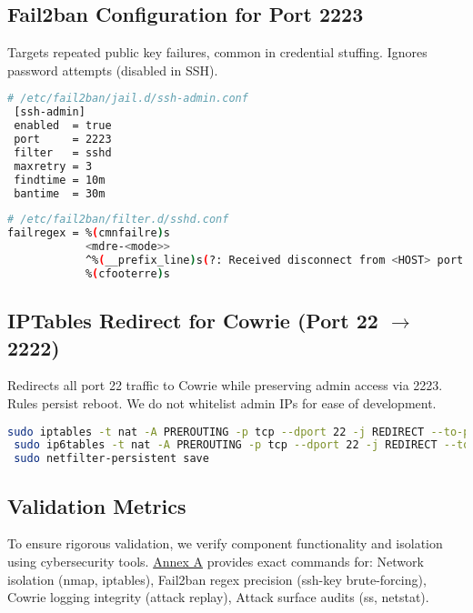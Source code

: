 \documentclass{cls/ULBreport}
\begin{document}
        
        \subsection{Fail2ban Configuration for Port 2223}
        Targets repeated public key failures, common in credential stuffing. Ignores password attempts (disabled in SSH).
        
        \begin{lstlisting}[language=bash,caption={Custom Jail Rules}]
 # /etc/fail2ban/jail.d/ssh-admin.conf
 [ssh-admin]
 enabled  = true
 port     = 2223
 filter   = sshd
 maxretry = 3  
 findtime = 10m
 bantime  = 30m
        \end{lstlisting}
        
        \begin{lstlisting}[language=bash,caption={Regex Filter Against Key-Based Attacks}]
 # /etc/fail2ban/filter.d/sshd.conf
failregex = %(cmnfailre)s
            <mdre-<mode>>
            ^%(__prefix_line)s(?: Received disconnect from <HOST> port \d+: Too many authentication failures | Disconnected from <HOST> port \d+ due to: Authentication failed for .* publickey )
            %(cfooterre)s
        \end{lstlisting}
        
        
        \subsection{IPTables Redirect for Cowrie (Port 22 $\rightarrow$ 2222)}
        Redirects all port 22 traffic to Cowrie while preserving admin access via 2223. Rules persist reboot. We do not whitelist admin IPs for ease of development.
        \begin{lstlisting}[language=bash,caption={Traffic Redirection Pre-Cowrie}]
 sudo iptables -t nat -A PREROUTING -p tcp --dport 22 -j REDIRECT --to-port 2222
 sudo ip6tables -t nat -A PREROUTING -p tcp --dport 22 -j REDIRECT --to-port 2222
 sudo netfilter-persistent save
        \end{lstlisting}
        


        \subsection{Validation Metrics}  
        \label{sec:validation}  
        
        To ensure rigorous validation, we verify component functionality and isolation using cybersecurity tools.  
            \hyperref[annexa:network]{Annex A} provides exact commands for:  Network isolation (nmap, iptables), Fail2ban regex precision (ssh-key brute-forcing), Cowrie logging integrity (attack replay), Attack surface audits (ss, netstat).
        









    
    



    
\end{document}
